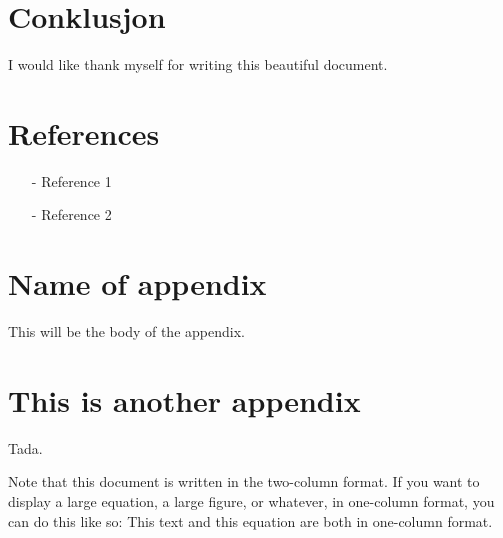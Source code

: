 \documentclass[reprint,english,notitlepage]{revtex4-1}  %
\begin{document}
\section{Conklusjon}
\begin{acknowledgments}  %
I would like thank myself for writing this beautiful document.
\end{acknowledgments}


\section*{References}  %
\begin{itemize}
\item[-]Reference 1
\item[-]Reference 2
\end{itemize}

\newpage
\appendix
\section{Name of appendix}
This will be the body of the appendix.
\section{This is another appendix}\label{appendix}
Tada.


\clearpage
Note that this document is written in the two-column format. If you want to display a large equation, a large figure, or whatever, in one-column format, you can do this like so:
\onecolumngrid
\vspace{1cm} %
This text and this equation are both in one-column format.
\end{document}
